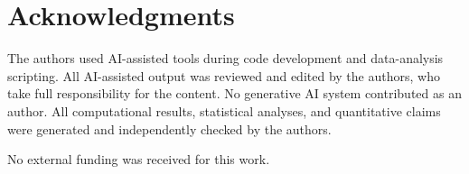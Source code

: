 \documentclass[journal=jcisd8,manuscript=article]{achemso}
\begin{document}
\section*{Acknowledgments}
The authors used AI-assisted tools during code development and data-analysis scripting. All AI-assisted output was reviewed and edited by the authors, who take full responsibility for the content. No generative AI system contributed as an author. All computational results, statistical analyses, and quantitative claims were generated and independently checked by the authors.



\begin{acknowledgement}
No external funding was received for this work.
\end{acknowledgement}
\end{document}

